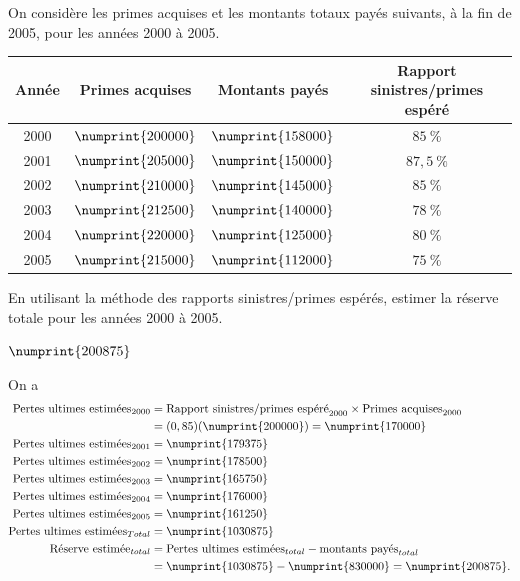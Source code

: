 \begin{exercice}
  On considère les primes acquises et les montants totaux payés
  suivants, à la fin de 2005, pour les années 2000 à 2005.
  \begin{center}
    \begin{tabular}{|c | c c c |}\hline
      Année & Primes acquises & Montants payés & Rapport sinistres/primes espéré\\ \hline
      2000 & $\numprint{200000}$ & $\numprint{158000}$ & $85~\%$\\
      2001 & $\numprint{205000}$ & $\numprint{150000}$ & $87,5~\%$\\
      2002 & $\numprint{210000}$ & $\numprint{145000}$ & $85~\%$\\
      2003 & $\numprint{212500}$ & $\numprint{140000}$ & $78~\%$\\
      2004 & $\numprint{220000}$ & $\numprint{125000}$ & $80~\%$\\
      2005 & $\numprint{215000}$ & $\numprint{112000}$ & $75~\%$ \\ \hline
    \end{tabular}
  \end{center}
  En utilisant la méthode des rapports sinistres/primes espérés,
  estimer la réserve totale pour les années 2000 à 2005.
  \begin{rep}
    $\numprint{200875}$
  \end{rep}
  \begin{sol}
    On a
    \begin{align*}
      \text{Pertes ultimes estimées}_{2000} &= \text{Rapport
                                              sinistres/primes espéré}_{2000} \times \text{Primes
                                              acquises}_{2000}\\
                                            &= (0,85)(\numprint{200000}) = \numprint{170000}\\
      \text{Pertes ultimes estimées}_{2001} &= \numprint{179375}\\
      \text{Pertes ultimes estimées}_{2002} &= \numprint{178500}\\
      \text{Pertes ultimes estimées}_{2003} &= \numprint{165750}\\
      \text{Pertes ultimes estimées}_{2004} &= \numprint{176000}\\
      \text{Pertes ultimes estimées}_{2005} &= \numprint{161250}\\
      \text{Pertes ultimes estimées}_{Total} &= \numprint{1030875}\\
      \text{Réserve estimée}_{total} &= \text{Pertes ultimes estimées}_{total} - \text{montants payés}_{total}\\
                                            &=  \numprint{1030875} - \numprint{830000} = \numprint{200875}.
    \end{align*}
  \end{sol}
\end{exercice}

